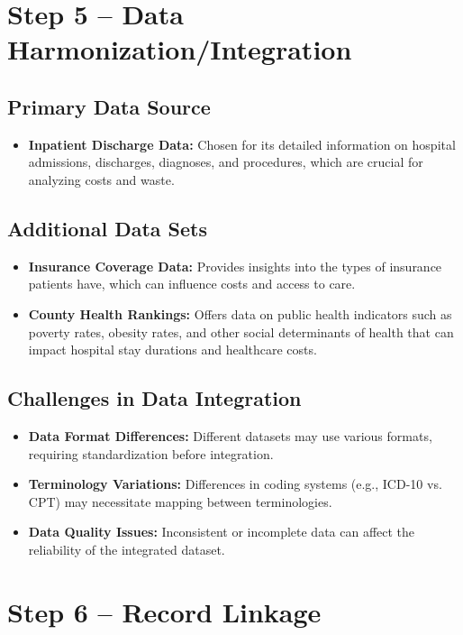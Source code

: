 \documentclass{article}
\begin{document}
\section*{Step 5 – Data Harmonization/Integration}
\subsection*{Primary Data Source}
\begin{itemize}
    \item \textbf{Inpatient Discharge Data:} Chosen for its detailed information on hospital admissions, discharges, diagnoses, and procedures, which are crucial for analyzing costs and waste.
\end{itemize}

\subsection*{Additional Data Sets}
\begin{itemize}
    \item \textbf{Insurance Coverage Data:} Provides insights into the types of insurance patients have, which can influence costs and access to care.
    \item \textbf{County Health Rankings:} Offers data on public health indicators such as poverty rates, obesity rates, and other social determinants of health that can impact hospital stay durations and healthcare costs.
\end{itemize}

\subsection*{Challenges in Data Integration}
\begin{itemize}
    \item \textbf{Data Format Differences:} Different datasets may use various formats, requiring standardization before integration.
    \item \textbf{Terminology Variations:} Differences in coding systems (e.g., ICD-10 vs. CPT) may necessitate mapping between terminologies.
    \item \textbf{Data Quality Issues:} Inconsistent or incomplete data can affect the reliability of the integrated dataset.
\end{itemize}

\section*{Step 6 – Record Linkage}
\end{document}
